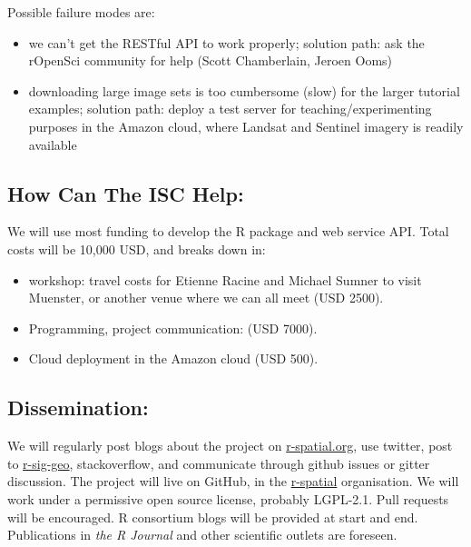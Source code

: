 \noindent
Possible failure modes are:

\begin{itemize}
\tightlist
\item
  we can't get the RESTful API to work properly; solution path: ask the
  rOpenSci community for help (Scott Chamberlain, Jeroen Ooms)
\item
  downloading large image sets is too cumbersome (slow) for the larger
  tutorial examples; solution path: deploy a test server for
  teaching/experimenting purposes in the Amazon cloud, where Landsat and
  Sentinel imagery is readily available
\end{itemize}

\subsection*{How Can The ISC Help:}\label{how-can-the-isc-help}

We will use most funding to develop the R package and web service API.
Total costs will be 10,000 USD, and breaks down in:

\begin{itemize}
\tightlist
\item
  workshop: travel costs for Etienne Racine and Michael Sumner to visit
  Muenster, or another venue where we can all meet (USD 2500).
\item
  Programming, project communication: (USD 7000).
\item
  Cloud deployment in the Amazon cloud (USD 500).
\end{itemize}

\subsection*{Dissemination:}\label{dissemination}

We will regularly post blogs about the project on
\href{http://r-spatial.org/}{r-spatial.org}, use twitter, post to
\href{https://stat.ethz.ch/mailman/listinfo/r-sig-geo}{r-sig-geo},
stackoverflow, and communicate through github issues or gitter
discussion. The project will live on GitHub, in the
\href{https://github.com/r-spatial/}{r-spatial} organisation. We will
work under a permissive open source license, probably LGPL-2.1. Pull
requests will be encouraged. R consortium blogs will be provided at
start and end. Publications in \emph{the R Journal} and other scientific
outlets are foreseen.
